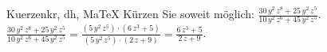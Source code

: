 \begin{MAufgabe}{Kuerzen}{kr, dh, MaTeX}
K\"urzen Sie soweit m\"oglich: $\frac{30\, y^2\, z^8 + 25\, y^2\, z^5}{10\, y^2\, z^6 + 45\, y^2\, z^5}$.\\ 
\ifLsg\MLoesung
\quad $\frac{30\, y^2\, z^8 + 25\, y^2\, z^5}{10\, y^2\, z^6 + 45\, y^2\, z^5}=\frac{(5\, y^2\, z^5)\cdot(6\, z^3 + 5)}{(5\, y^2\, z^5)\cdot(2\, z + 9)}=\frac{6\, z^3 + 5}{2\, z + 9}$.\else\relax\fi
 \end{MAufgabe}